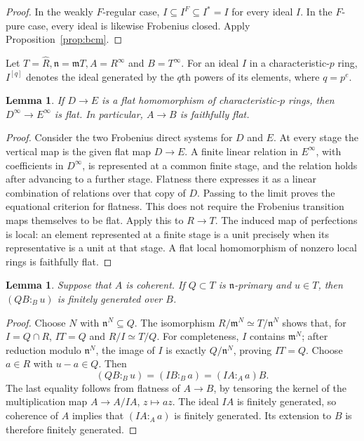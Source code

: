 \documentclass[11pt,a4paper]{amsart}
\numberwithin{equation}{section}
\newtheorem{lemma}[theorem]{Lemma}
\newcommand{\fm}{\mathfrak m}
\newcommand{\fn}{\mathfrak n}
\begin{document}
 \begin{proof}	In the weakly $F$-regular case,	$I\subseteq I^F\subseteq I^*=I$ for every ideal $I$.	In the $F$-pure case, every ideal is likewise Frobenius closed.	Apply Proposition~\ref{prop:bcm}.
 \end{proof}
 
 
 
 
 Let
$T=\widehat R, \fn=\fm T,
 A=R^\infty$ and $ B=T^\infty.$
 For an ideal $I$ in a characteristic-$p$ ring, $I^{[q]}$ denotes
 the ideal generated by the $q$th powers of its elements, where
 $q=p^e$. 
 
 \begin{lemma}\label{lem:flat}	If $D\to E$ is a flat homomorphism of characteristic-$p$ rings,	then $D^\infty\to E^\infty$ is flat. In particular, $A\to B$ is	faithfully flat.
 \end{lemma}
 
 \begin{proof}	Consider the two Frobenius direct systems for $D$ and $E$.	At every stage the vertical map is the given flat map $D\to E$.	A finite linear relation in $E^\infty$, with coefficients in	$D^\infty$, is represented at a common finite stage, and the 	relation holds after advancing to a further stage. Flatness there	expresses it as a linear combination of relations over that copy	of $D$. Passing to the limit proves the equational criterion for	flatness. This does not require the Frobenius transition maps	themselves to be flat.
 Apply this to  $R\to T$. The induced map	of perfections is local: an element represented at a finite stage	is a unit precisely when its representative is a unit at that	stage. A flat local homomorphism of nonzero local rings is	faithfully flat.
 \end{proof}
 
 \begin{lemma}\label{lem:colon}	Suppose that $A$ is coherent. If $Q\subset T$ is $\fn$-primary	and $u\in T$, then $(QB:_B u)$ is finitely generated over $B$.
 \end{lemma}
 
 \begin{proof}	Choose $N$ with $\fn^N\subseteq Q$. The isomorphism
 	$R/\fm^N\simeq T/\fn^N$ shows that, for $I=Q\cap R$,
$IT=Q$ and $ R/I\simeq T/Q.$
For completeness, $I$ contains $\fm^N$; after reduction modulo	$\fn^N$, the image of $I$ is exactly $Q/\fn^N$, proving $IT=Q$.	Choose $a\in R$ with $u-a\in Q$. Then	$$	(QB:_B u)=(IB:_B a)=(IA:_A a)B.	$$	The last equality follows from flatness of $A\to B$, by tensoring	the kernel of the multiplication map $A\to A/IA$, $z\mapsto az$.	The ideal $IA$ is finitely generated, so coherence of $A$ implies	that $(IA:_A a)$ is finitely generated. Its extension to $B$ is
therefore finitely generated.
 \end{proof}
 
\end{document}
